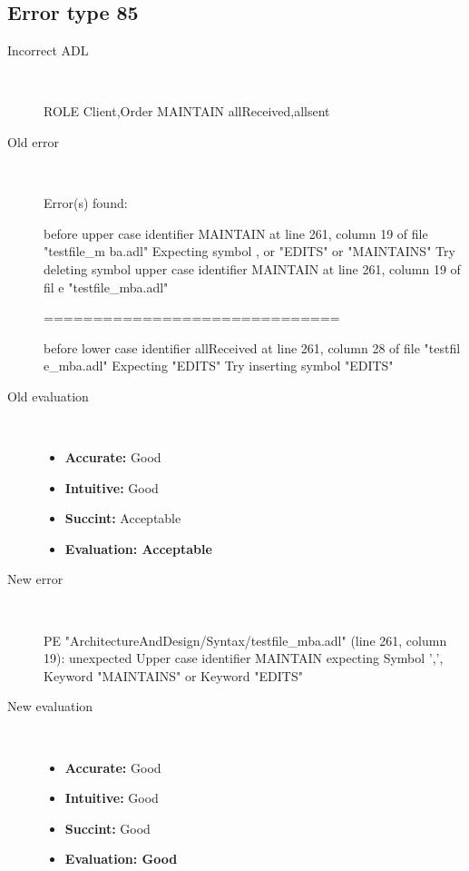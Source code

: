 \hrulefill

\subsection{Error type 85}
  \begin{description}
  \item[Incorrect ADL]~\\
\begin{adl}
ROLE Client,Order MAINTAIN allReceived,allsent\end{adl}
  \item[Old error]~\\
\begin{haskell}
Error(s) found:

before upper case identifier MAINTAIN at line 261, column 19 of file "testfile_m
ba.adl"
Expecting symbol , or "EDITS" or "MAINTAINS"
Try deleting symbol upper case identifier MAINTAIN at line 261, column 19 of fil
e "testfile_mba.adl"

==============================

before lower case identifier allReceived at line 261, column 28 of file "testfil
e_mba.adl"
Expecting "EDITS"
Try inserting symbol "EDITS"\end{haskell}
  \item[Old evaluation]~\\
    \begin{itemize}
    \item \textbf{Accurate:} Good
    \item \textbf{Intuitive:} Good
    \item \textbf{Succint:} Acceptable
    \item \textbf{Evaluation: Acceptable}
    \end{itemize}
  \item[New error]~\\
\begin{haskell}
PE "ArchitectureAndDesign/Syntax/testfile_mba.adl" (line 261, column 19):
unexpected Upper case identifier MAINTAIN
expecting Symbol ',', Keyword "MAINTAINS" or Keyword "EDITS"\end{haskell}
  \item[New evaluation]~\\
    \begin{itemize}
    \item \textbf{Accurate:} Good
    \item \textbf{Intuitive:} Good
    \item \textbf{Succint:} Good
    \item \textbf{Evaluation: Good
}
    \end{itemize}
  \end{description}